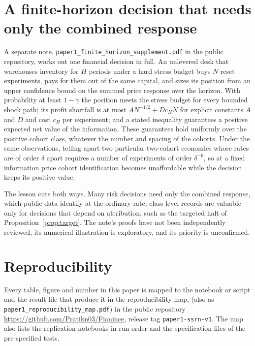 \documentclass[12pt]{article}
\theoremstyle{definition}
\theoremstyle{remark}
\begin{document}
\section{A finite-horizon decision that needs only the combined response}\label{app:fhc}
A separate note, \texttt{paper1\_finite\_horizon\_supplement.pdf} in the public repository, works out one financial decision in full. An unlevered desk that warehouses inventory for $H$ periods under a hard stress budget buys $N$ reset experiments, pays for them out of the same capital, and sizes its position from an upper confidence bound on the summed price response over the horizon. With probability at least $1-\gamma$ the position meets the stress budget for every bounded shock path; its profit shortfall is at most $AN^{-1/2}+Dc_HN$ for explicit constants $A$ and $D$ and cost $c_H$ per experiment; and a stated inequality guarantees a positive expected net value of the information. These guarantees hold uniformly over the positive cohort class, whatever the number and spacing of the cohorts. Under the same observations, telling apart two particular two-cohort economies whose rates are of order $\delta$ apart requires a number of experiments of order $\delta^{-6}$, so at a fixed information price cohort identification becomes unaffordable while the decision keeps its positive value.

The lesson cuts both ways. Many risk decisions need only the combined response, which public data identify at the ordinary rate; class-level records are valuable only for decisions that depend on attribution, such as the targeted halt of Proposition~\ref{prop:target}. The note's proofs have not been independently reviewed, its numerical illustration is exploratory, and its priority is unconfirmed.

\section{Reproducibility}\label{app:repro}
Every table, figure and number in this paper is mapped to the notebook or script and the result file that produce it in the reproducibility map,  (also as \texttt{paper1\_reproducibility\_map.pdf}) in the public repository \url{https://github.com/Pratikn03/Fianince}, release tag \texttt{paper1-ssrn-v1}. The map also lists the replication notebooks in run order and the specification files of the pre-specified tests.
\end{document}
